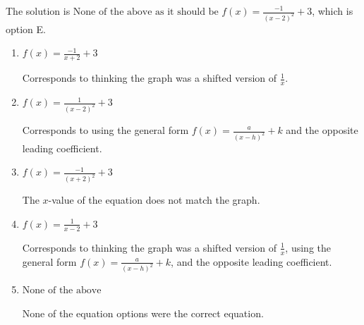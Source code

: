\documentclass{extbook}[14pt]
\begin{document}
\begin{enumerate}
{The solution is \( \text{None of the above as it should be } f(x) = \frac{-1}{(x - 2)^2} + 3 \), which is option E.\begin{enumerate}[label=\Alph*.]
\item \( f(x) = \frac{-1}{x + 2} + 3 \)

Corresponds to thinking the graph was a shifted version of $\frac{1}{x}$.
\item \( f(x) = \frac{1}{(x - 2)^2} + 3 \)

Corresponds to using the general form $f(x) = \frac{a}{(x-h)^2}+k$ and the opposite leading coefficient.
\item \( f(x) = \frac{-1}{(x + 2)^2} + 3 \)

The $x$-value of the equation does not match the graph.
\item \( f(x) = \frac{1}{x - 2} + 3 \)

Corresponds to thinking the graph was a shifted version of $\frac{1}{x}$, using the general form $f(x) = \frac{a}{(x-h)^2}+k$, and the opposite leading coefficient.
\item \( \text{None of the above} \)

None of the equation options were the correct equation.
\end{enumerate}

}
\end{enumerate}
\end{document}
